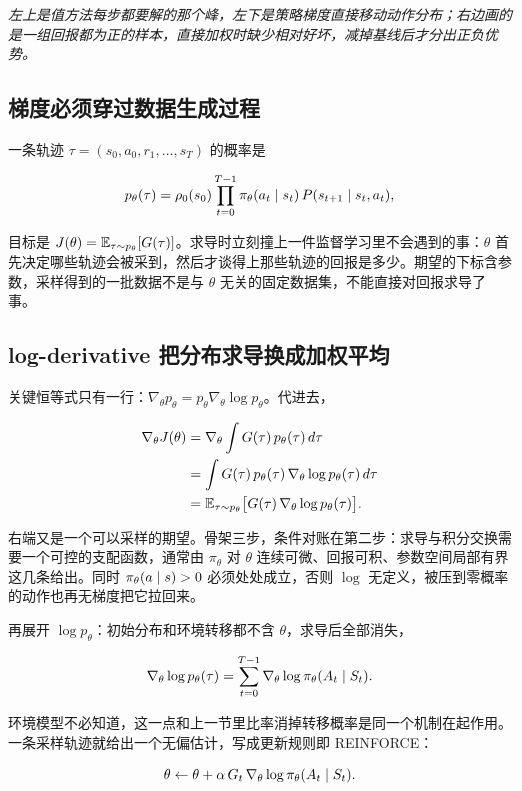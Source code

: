\emph{左上是值方法每步都要解的那个峰，左下是策略梯度直接移动动作分布；右边画的是一组回报都为正的样本，直接加权时缺少相对好坏，减掉基线后才分出正负优势。}

\subsection{梯度必须穿过数据生成过程}

一条轨迹 \(\tau=(s_0,a_0,r_1,\dots,s_T)\) 的概率是

\[
p_\theta(\tau)=\rho_0(s_0)\prod_{t=0}^{T-1}\pi_\theta(a_t\mid s_t)\,P(s_{t+1}\mid s_t,a_t),
\]

目标是 \(J(\theta)=\mathbb{E}_{\tau\sim p_\theta}[G(\tau)]\)。求导时立刻撞上一件监督学习里不会遇到的事：\(\theta\) 首先决定哪些轨迹会被采到，然后才谈得上那些轨迹的回报是多少。期望的下标含参数，采样得到的一批数据不是与 \(\theta\) 无关的固定数据集，不能直接对回报求导了事。

\subsection{log-derivative 把分布求导换成加权平均}

关键恒等式只有一行：\(\nabla_\theta p_\theta=p_\theta\nabla_\theta\log p_\theta\)。代进去，

\[
\begin{aligned}
\nabla_\theta J(\theta)
&=\nabla_\theta\int G(\tau)\,p_\theta(\tau)\,d\tau\\
&=\int G(\tau)\,p_\theta(\tau)\,\nabla_\theta\log p_\theta(\tau)\,d\tau\\
&=\mathbb{E}_{\tau\sim p_\theta}\big[G(\tau)\,\nabla_\theta\log p_\theta(\tau)\big].
\end{aligned}
\]

右端又是一个可以采样的期望。骨架三步，条件对账在第二步：求导与积分交换需要一个可控的支配函数，通常由 \(\pi_\theta\) 对 \(\theta\) 连续可微、回报可积、参数空间局部有界这几条给出。同时 \(\pi_\theta(a\mid s)>0\) 必须处处成立，否则 \(\log\) 无定义，被压到零概率的动作也再无梯度把它拉回来。

再展开 \(\log p_\theta\)：初始分布和环境转移都不含 \(\theta\)，求导后全部消失，

\[
\nabla_\theta\log p_\theta(\tau)=\sum_{t=0}^{T-1}\nabla_\theta\log\pi_\theta(A_t\mid S_t).
\]

环境模型不必知道，这一点和上一节里比率消掉转移概率是同一个机制在起作用。一条采样轨迹就给出一个无偏估计，写成更新规则即 REINFORCE：

\[
\theta\leftarrow\theta+\alpha\,G_t\,\nabla_\theta\log\pi_\theta(A_t\mid S_t).
\]

